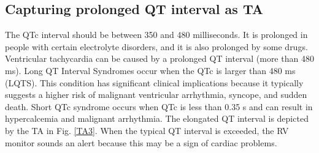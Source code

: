 \subsection{Capturing prolonged QT interval as TA}

The QTc interval should be between 350 and 480 milliseconds. It is
prolonged in people with certain electrolyte disorders, and it is also
prolonged by some drugs. Ventricular tachycardia can be caused
by a prolonged QT interval (more than 480 ms). Long QT Interval
Syndromes occur when the QTc is larger than 480 ms (LQTS). This
condition has significant clinical implications because it typically suggests a higher risk of malignant ventricular arrhythmia, syncope,
and sudden death. Short QTc syndrome occurs when QTc is less than
0.35 s and can result in hypercalcemia and malignant arrhythmia.
The elongated QT interval is depicted by the TA in Fig. \ref{TA3}. When
the typical QT interval is exceeded, the RV monitor sounds an alert
because this may be a sign of cardiac problems.

